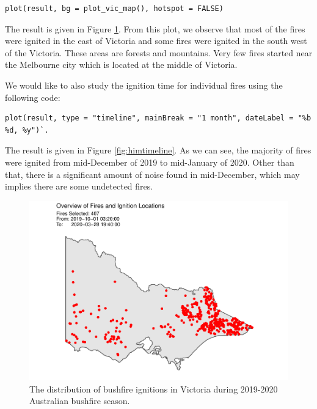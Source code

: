 \begin{verbatim}
plot(result, bg = plot_vic_map(), hotspot = FALSE)
\end{verbatim}

The result is given in Figure \ref{fig:clusteringfinalresults}. From
this plot, we observe that most of the fires were ignited in the east of
Victoria and some fires were ignited in the south west of the Victoria.
These areas are forests and mountains. Very few fires started near the
Melbourne city which is located at the middle of Victoria.

We would like to also study the ignition time for individual fires using
the following code:

\begin{verbatim}
plot(result, type = "timeline", mainBreak = "1 month", dateLabel = "%b %d, %y")`. 
\end{verbatim}

The result is given in Figure \ref{fig:himtimeline}. As we can see, the
majority of fires were ignited from mid-December of 2019 to mid-January
of 2020. Other than that, there is a significant amount of noise found
in mid-December, which may implies there are some undetected fires.

\begin{Schunk}
\begin{figure}

{\centering \includegraphics[width=0.8\linewidth]{clustering_paper_files/figure-latex/clusteringfinalresults-1} 

}

\caption[ The distribution of bushfire ignitions in Victoria during 2019-2020 Australian bushfire season]{ The distribution of bushfire ignitions in Victoria during 2019-2020 Australian bushfire season.}\label{fig:clusteringfinalresults}
\end{figure}
\end{Schunk}

